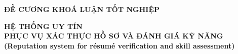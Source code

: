 \documentclass{article}[14pt]
\begin{document}
\begin{figure}[h]
    \begin{floatrow}
        {%

        }
        {%

        }
    \end{floatrow}
\end{figure}

\begin{center}

    \textbf{\huge ĐỀ CƯƠNG KHOÁ LUẬN TỐT NGHIỆP} \\
\end{center}


\begin{center}

    \textbf{\Large HỆ THỐNG UY TÍN \\ PHỤC VỤ XÁC THỰC HỒ SƠ VÀ ĐÁNH GIÁ KỸ NĂNG}
    \\

    \vspace{.5cm}
    \textbf{\Large (Reputation system for résumé verification and skill assessment)}
\end{center}
\end{document}
